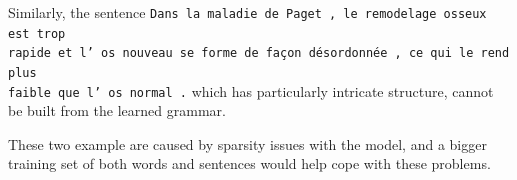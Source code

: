 \documentclass[11pt]{article}
\begin{document}
    Similarly, the sentence \texttt{Dans la maladie de Paget , le remodelage 
    osseux est trop \\rapide et l' os nouveau se forme de façon désordonnée , 
    ce qui le rend plus \\faible que l' os normal .} which has particularly 
    intricate structure, cannot be built from the learned grammar. 

    These two example are caused by sparsity issues with the model, and a 
    bigger training set of both words and sentences would help cope with these 
    problems.
\end{document}

